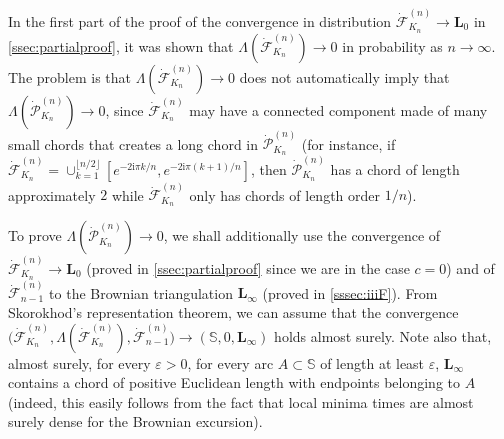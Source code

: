 \documentclass[10pt]{amsart}
\theoremstyle{definition}\newtheorem{defi}[theo]{Definition}\newtheorem{rema}[theo]{Remark}\newtheorem{exam}[theo]{Example}\newtheorem{exem}[theo]{Example}\newtheorem{nota}[theo]{Notation}
\def\S{\mathbb{S}}
\def\i{\mathrm{i}}
\def\dFKn{\dot{\mathcal{F}}^{(n)}_{K_{n}}}
\def\dPKn{\dot{\mathcal{P}}^{(n)}_{K_{n}}}
\renewcommand{\epsilon}{\varepsilon}
\begin{document}
In the first part of the proof of the convergence in distribution $\dFKn \rightarrow \mathbf{L}_0$ in \cref{ssec:partialproof}, it was shown that  $\Lambda(\dFKn) \rightarrow 0$ in probability as $n \rightarrow \infty$.
The problem is that $\Lambda(\dFKn) \rightarrow 0$ does not automatically imply that $\Lambda(\dPKn) \rightarrow 0$,
since $\dFKn$ may have a connected component made of many small chords
that creates a long chord in $\dPKn$ (for instance, if $\dFKn= \cup_{k=1}^{\lfloor n/2 \rfloor} [e^{-2 \i \pi k/n},e^{-2 \i \pi (k+1)/n}]$, then $\dPKn$ has a chord of length approximately $2$ while $\dFKn$ only has chords of length order $1/n$).

To prove $\Lambda(\dPKn) \rightarrow 0$, we shall additionally use the convergence
of $\dFKn \rightarrow \mathbf{L}_0$ (proved in \cref{ssec:partialproof} since we are in the case $c=0$)
and of $\dot{\mathcal{F}}^{(n)}_{n-1}$ to the Brownian triangulation $\mathbf{L}_{\infty}$ (proved in \cref{sssec:iiiF}).
From Skorokhod's representation theorem, we can assume that the convergence
$\big(\dFKn, \Lambda(\dFKn), \dot{\mathcal{F}}^{(n)}_{n-1}\big) \rightarrow (\S,0,\mathbf{L}_{\infty})$ holds almost surely.
Note also that, almost surely, for every $\epsilon>0$, for every arc ${A} \subset \S$ of length at least $\epsilon$,
$\mathbf{L}_{\infty}$ contains a chord of positive Euclidean length with endpoints belonging to $ {A}$ (indeed, this easily follows from the fact that local minima times are almost surely dense for the Brownian excursion).
\end{document}
